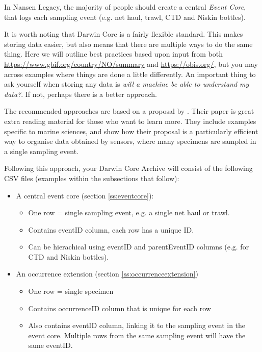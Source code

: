 \documentclass[a4paper,english, 11pt]{article}
\begin{document}
In Nansen Legacy, the majority of people should create a central \textit{Event Core}, that logs each sampling event (e.g. net haul, trawl, CTD and Niskin bottles).

It is worth noting that Darwin Core is a fairly flexible standard. This makes storing data easier, but also means that there are multiple ways to do the same thing. Here we will outline best practices based upon input from both \href{GBIF Norway}{https://www.gbif.org/country/NO/summary} and \href{OBIS}{https://obis.org/}, but you may across examples where things are done a little differently. An important thing to ask yourself when storing any data is \textit{will a machine be able to understand my data?}. If not, perhaps there is a better approach.

The recommended approaches are based on a proposal by \cite[][option 6]{de2017toward}. Their paper is great extra reading material for those who want to learn more. They include examples specific to marine sciences, and show how their proposal is a particularly efficient way to organise data obtained by sensors, where many specimens are sampled in a single sampling event.

Following this approach, your Darwin Core Archive will consist of the following CSV files (examples within the subsections that follow):

\begin{itemize}
\item A central event core (section \ref{ss:eventcore}):
\begin{itemize}
\item One row = single sampling event, e.g. a single net haul or trawl.
\item Contains eventID column, each row has a unique ID.
\item Can be hierachical using eventID and parentEventID columns (e.g. for CTD and Niskin bottles).
\end{itemize}
\item An occurrence extension (section \ref{ss:occurrenceextension})
\begin{itemize}
\item One row = single specimen
\item Contains occurrenceID column that is unique for each row
\item Also contains eventID column, linking it to the sampling event in the event core. Multiple rows from the same sampling event will have the same eventID. 
\end{itemize}
\end{itemize}
\end{document}
